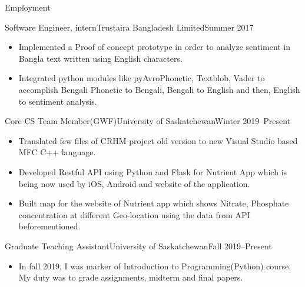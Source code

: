 \documentclass[]{mcdowellcv}
\begin{document}
	\begin{cvsection}{Employment}
	
    	\begin{cvsubsection}{Software Engineer, intern}{Trustaira Bangladesh Limited}{Summer 2017}
    	    \begin{itemize}
    	        \item Implemented a Proof of concept prototype in order to analyze sentiment in Bangla text written using English characters.
    	        \item Integrated python modules like pyAvroPhonetic, Textblob, Vader to accomplish Bengali Phonetic to Bengali, Bengali to English and then, English to sentiment analysis. 
    	        
    	    \end{itemize}
    	
    	\end{cvsubsection}
    	
    	\begin{cvsubsection}{Core CS Team Member(GWF)}{University of Saskatchewan}{Winter 2019--Present}
    	    \begin{itemize}
    	        \item Translated few files of CRHM project old version to new Visual Studio based MFC C++ language.
    	        \item Developed Restful API using Python and Flask for Nutrient App which is being now used by iOS, Android and website of the application.
    	        \item Built map for the website of Nutrient app which shows Nitrate, Phosphate concentration at different Geo-location using the data from API beforementioned.
    	    \end{itemize}
    	
        \end{cvsubsection}
        
        \begin{cvsubsection}{Graduate Teaching Assistant}{University of Saskatchewan}{Fall 2019--Present}
    	    \begin{itemize}
    	        \item In fall 2019, I was marker of Introduction to Programming(Python) course. My duty was to grade assignments, midterm and final papers.
    	        
    	    \end{itemize}
    	
        \end{cvsubsection}
	
	
	
	\end{cvsection}
	
\end{document}
